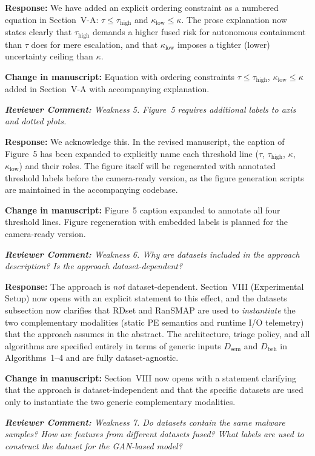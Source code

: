 \documentclass[11pt,a4paper]{article}
\newcommand{\RC}[1]{\begin{reviewbox}\textit{\textbf{Reviewer Comment:} #1}\end{reviewbox}}
\newcommand{\RS}[1]{\noindent\textcolor{responsegreen}{\textbf{Response:}} #1\par\medskip}
\newcommand{\CH}[1]{\noindent\textcolor{changebrown}{\textbf{Change in manuscript:}} #1\par\bigskip}
\begin{document}
\RS{We have added an explicit ordering constraint as a numbered equation in
Section~V-A:
$\tau \le \tau_{\text{high}}$ and $\kappa_{\text{low}} \le \kappa$.
The prose explanation now states clearly that $\tau_{\text{high}}$ demands a higher
fused risk for autonomous containment than $\tau$ does for mere escalation, and that
$\kappa_{\text{low}}$ imposes a tighter (lower) uncertainty ceiling than $\kappa$.}

\CH{Equation with ordering constraints $\tau \le \tau_{\text{high}}$,
$\kappa_{\text{low}} \le \kappa$ added in Section~V-A with accompanying explanation.}

\RC{Weakness 5. Figure~5 requires additional labels to axis and dotted plots.}

\RS{We acknowledge this. In the revised manuscript, the caption of Figure~5 has been
expanded to explicitly name each threshold line ($\tau$, $\tau_{\text{high}}$,
$\kappa$, $\kappa_{\text{low}}$) and their roles. The figure itself will be
regenerated with annotated threshold labels before the camera-ready version, as the
figure generation scripts are maintained in the accompanying codebase.}

\CH{Figure~5 caption expanded to annotate all four threshold lines.
Figure regeneration with embedded labels is planned for the camera-ready version.}

\RC{Weakness 6. Why are datasets included in the approach description? Is the
approach dataset-dependent?}

\RS{The approach is \emph{not} dataset-dependent. Section~VIII (Experimental Setup)
now opens with an explicit statement to this effect, and the datasets subsection
now clarifies that RDset and RanSMAP are used to \emph{instantiate} the two
complementary modalities (static PE semantics and runtime I/O telemetry) that the
approach assumes in the abstract. The architecture, triage policy, and all algorithms
are specified entirely in terms of generic inputs $D_{\text{sem}}$ and $D_{\text{beh}}$
in Algorithms~1--4 and are fully dataset-agnostic.}

\CH{Section~VIII now opens with a statement clarifying that the approach is
dataset-independent and that the specific datasets are used only to instantiate
the two generic complementary modalities.}

\RC{Weakness 7. Do datasets contain the same malware samples? How are features from
different datasets fused? What labels are used to construct the dataset for the
GAN-based model?}
\end{document}
